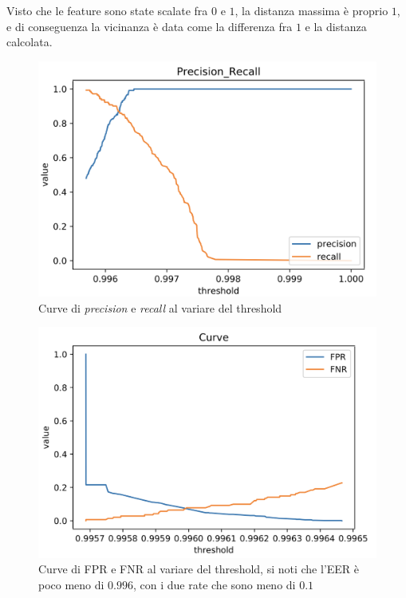 \documentclass[8pt,notitlepage]{report}
\begin{document}
			Visto che le feature sono state scalate fra $ 0 $ e $ 1 $, la distanza massima è proprio $ 1 $, e di conseguenza la vicinanza è data come la differenza fra $ 1 $ e la distanza calcolata. 
			
			\begin{figure}[H]
				\begin{center}
					\includegraphics[scale=.45]{precision_recall_DTW}
					\caption{Curve di \textit{precision} e \textit{recall} al variare del threshold}
				\end{center}
			\end{figure}
			
			\begin{figure}[H]
				\begin{center}
					\includegraphics[scale=.45]{fpr_fnr_DTW}
					\caption{Curve di FPR e FNR al variare del threshold, si noti che l'EER è poco meno di $ 0.996 $, con i due rate che sono meno di $ 0.1 $}
				\end{center}
			\end{figure}
		
\end{document}
